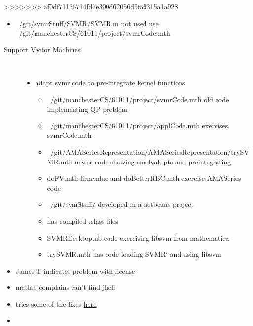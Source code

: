 \documentclass[hyperref]{labbook}
\begin{document}
>>>>>>> af0df71136714fd7e300d62056d5fa9315a1a928


\begin{itemize}
\item ~/git/svmrStuff/SVMR/SVMR.m not used  use ~/git/manchesterCS/61011/project/svmrCode.mth
\end{itemize}

\begin{description}
\item[Support Vector Machines] \ 
  \begin{itemize}
  \item adapt svmr code to pre-integrate  kernel functions
    \begin{itemize}
    \item ~/git/manchesterCS/61011/project/svmrCode.mth old code implementing QP problem
    \item ~/git/manchesterCS/61011/project/applCode.mth exercises svmrCode.mth
    \item ~/git/AMASeriesRepresentation/AMASeriesRepresentation/trySVMR.mth  newer code showing smolyak pts  and preintegrating
    \item doFV.mth firmvalue and doBetterRBC.mth exercise AMASeries code
    \item ~/git/svmStuff/  developed in a netbeans project
    \item  has compiled .class files
    \item SVMRDesktop.nb code exercising libsvm from mathematica
    \item trySVMR.mth has code loading SVMR` and using libsvm
    \end{itemize}
  \end{itemize}
\end{description}

\begin{itemize}
\item James T indicates problem with license
\item matlab complains can't find jhcli
\item tries some of the fixes \href{https://www.mathworks.com/matlabcentral/answers/102751-how-do-i-configure-the-java-run-time-library-path-java-library-path-in-matlab-with-and-without-adm
}{here }
\item 
\end{itemize}
\end{document}
